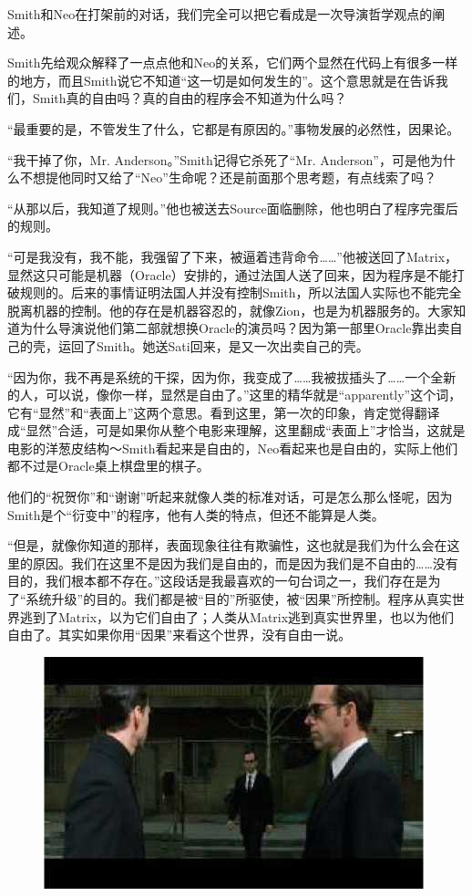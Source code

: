 \documentclass[UTF8]{ctexart}
\begin{document}
Smith和Neo在打架前的对话，我们完全可以把它看成是一次导演哲学观点的阐述。

Smith先给观众解释了一点点他和Neo的关系，它们两个显然在代码上有很多一样的地方，而且Smith说它不知道“这一切是如何发生的”。这个意思就是在告诉我们，Smith真的自由吗？真的自由的程序会不知道为什么吗？

“最重要的是，不管发生了什么，它都是有原因的。”事物发展的必然性，因果论。

“我干掉了你，Mr. Anderson。”Smith记得它杀死了“Mr. Anderson”，可是他为什么不想提他同时又给了“Neo”生命呢？还是前面那个思考题，有点线索了吗？

“从那以后，我知道了规则。”他也被送去Source面临删除，他也明白了程序完蛋后的规则。

“可是我没有，我不能，我强留了下来，被逼着违背命令……”他被送回了Matrix，显然这只可能是机器（Oracle）安排的，通过法国人送了回来，因为程序是不能打破规则的。后来的事情证明法国人并没有控制Smith，所以法国人实际也不能完全脱离机器的控制。他的存在是机器容忍的，就像Zion，也是为机器服务的。大家知道为什么导演说他们第二部就想换Oracle的演员吗？因为第一部里Oracle靠出卖自己的壳，运回了Smith。她送Sati回来，是又一次出卖自己的壳。

“因为你，我不再是系统的干探，因为你，我变成了……我被拔插头了……一个全新的人，可以说，像你一样，显然是自由了。”这里的精华就是“apparently”这个词，它有“显然”和“表面上”这两个意思。看到这里，第一次的印象，肯定觉得翻译成“显然”合适，可是如果你从整个电影来理解，这里翻成“表面上”才恰当，这就是电影的洋葱皮结构～Smith看起来是自由的，Neo看起来也是自由的，实际上他们都不过是Oracle桌上棋盘里的棋子。

他们的“祝贺你”和“谢谢”听起来就像人类的标准对话，可是怎么那么怪呢，因为Smith是个“衍变中”的程序，他有人类的特点，但还不能算是人类。

“但是，就像你知道的那样，表面现象往往有欺骗性，这也就是我们为什么会在这里的原因。我们在这里不是因为我们是自由的，而是因为我们是不自由的……没有目的，我们根本都不存在。”这段话是我最喜欢的一句台词之一，我们存在是为了“系统升级”的目的。我们都是被“目的”所驱使，被“因果”所控制。程序从真实世界逃到了Matrix，以为它们自由了；人类从Matrix逃到真实世界里，也以为他们自由了。其实如果你用“因果”来看这个世界，没有自由一说。

\begin{figure}[htb]
\centering
\includegraphics[width=0.5\linewidth]{fig/read_reloaded-72}
\end{figure}
\end{document}

